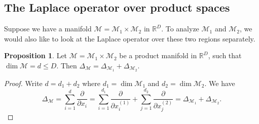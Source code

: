 \documentclass{article}
\numberwithin{equation}{section}
\theoremstyle{definition}
\newtheorem{prop}[thm]{Proposition}
\begin{document}
\subsection{The Laplace operator over product spaces}
Suppose we have a manifold $\mathcal{M} = \mathcal{M}_1 \times \mathcal{M}_2$ in $\mathbb{R}^D$. To analyze $\mathcal{M}_1$ and $\mathcal{M}_2$, we would also like to look at the Laplace operator over these two regions separately. 

\begin{prop}\label{laplace-sum-decomp}
Let $\mathcal{M} = \mathcal{M}_1 \times \mathcal{M}_2$ be a product manifold in $\mathbb{R}^D$, such that $\dim\mathcal{M} = d \le D$. Then $\Delta_\mathcal{M} = \Delta_{\mathcal{M}_1} + \Delta_{\mathcal{M}_2}$.
\end{prop}
\begin{proof}
Write $d = d_1+d_2$ where $d_1 = \dim\mathcal{M}_1$ and $d_2 = \dim\mathcal{M}_2$. We have
\begin{equation}
\Delta_{\mathcal{M}} = \sum_{i=1}^d \frac{\partial}{\partial x_i} = \sum_{i=1}^{d_1} \frac{\partial}{\partial x^{(1)}_i} + \sum_{j=1}^{d_2} \frac{\partial}{\partial x^{(2)}_j} = \Delta_{\mathcal{M}_1} + \Delta_{\mathcal{M}_2}.
\end{equation}
\end{proof}
\end{document}
